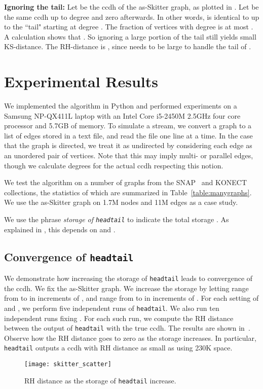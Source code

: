 \documentclass[11pt]{article}
\theoremstyle{definition}
\newcommand{\degdist}{{\tt headtail}}
\begin{document}
\textbf{Ignoring the tail:} Let  be the ccdh of the as-Skitter graph, as plotted in .
Let  be the same ccdh up to degree  and zero afterwards. In other words,  is identical to 
up to the ``tail" starting at degree . The fraction of vertices with degree  is at most .
A calculation shows that . So ignoring a large portion of the tail still yields
small KS-distance. The RH-distance is , since  needs to be large to handle
the tail of .

\section{Experimental Results} \label{sec:expresults}
We implemented the algorithm in Python and performed experiments on a Samsung
NP-QX411L laptop with an Intel Core i5-2450M 2.5GHz four core processor and
5.7GB of memory.  To simulate a stream, we convert a graph to a list of edges
stored in a text file, and read the file one line at a time.  In the case that
the graph is directed, we treat it as undirected by considering each edge as an
unordered pair of vertices.  Note that this may imply multi- or parallel edges,
though we calculate degrees for the actual ccdh respecting this notion.

We test the algorithm on a number of graphs from the SNAP~\cite{snap} and
KONECT~\cite{konect} collections, the statistics of which are summarized in
Table~\ref{table:manygraphs}.  We use the as-Skitter graph on 1.7M nodes and 11M
edges as a case study.

We use the phrase \emph{storage of \degdist} to indicate the total storage .
As explained in , this depends on  and .

\subsection{Convergence of \degdist} \label{sec:conv}
We demonstrate how increasing the storage of \degdist{} leads to convergence of
the ccdh. We fix the as-Skitter graph. We increase the storage by letting 
range from  to  in increments of , and  range from 
to  in increments of .  For each setting of  and , we
perform five independent runs of \degdist. We also run ten independent runs
fixing .  For each such run, we compute the RH distance
between the output of \degdist{} with the true ccdh. The results are shown
in~. Observe how the RH distance goes to zero as the
storage increases.  In particular, \degdist{} outputs a ccdh with RH distance as
small as  using 230K space.
\begin{figure}
\centering \texttt{[image: skitter\_scatter]}
\caption{RH distance as the storage of \degdist{} increase.}
\label{fig:skitter_scatter}
\end{figure}
\end{document}
